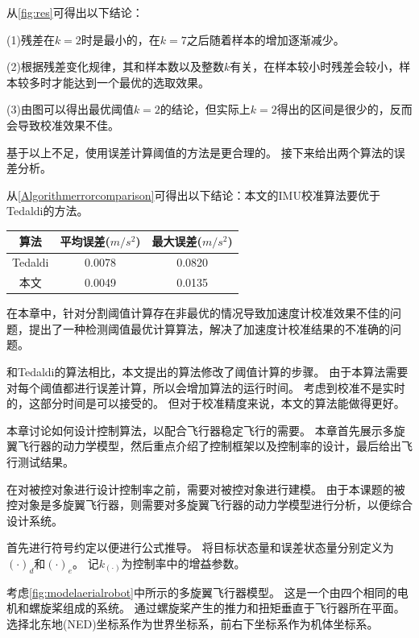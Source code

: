 \documentclass[
  type=master
]{gdutthesis}
\begin{document}
从\autoref{fig:res}可得出以下结论：

(1)残差在$k=2$时是最小的，在$k=7$之后随着样本的增加逐渐减少。

(2)根据残差变化规律，其和样本数以及整数$k$有关，在样本较小时残差会较小，样本较多时才能达到一个最优的选取效果。

(3)由图可以得出最优阈值$k=2$的结论，但实际上$k=2$得出的区间是很少的，反而会导致校准效果不佳。

基于以上不足，使用误差计算阈值的方法是更合理的。
接下来给出两个算法的误差分析。

从\autoref{Algorithmerrorcomparison}可得出以下结论：本文的IMU校准算法要优于Tedaldi的方法。
\begin{table}[h]
	\label{Algorithmerrorcomparison}
	\begin{tabular}{ccc}
		\toprule
		算法 & 平均误差($m/s^2$) & 最大误差($m/s^2$) \\
		\midrule
		Tedaldi & 0.0078 & 0.0820 \\
		本文 & 0.0049 & 0.0135 \\
		\bottomrule
	\end{tabular}
\end{table}

在本章中，针对分割阈值计算存在非最优的情况导致加速度计校准效果不佳的问题，提出了一种检测阈值最优计算算法，解决了加速度计校准结果的不准确的问题。

和Tedaldi的算法相比，本文提出的算法修改了阈值计算的步骤。
由于本算法需要对每个阈值都进行误差计算，所以会增加算法的运行时间。
考虑到校准不是实时的，这部分时间是可以接受的。
但对于校准精度来说，本文的算法能做得更好。

本章讨论如何设计控制算法，以配合飞行器稳定飞行的需要。
本章首先展示多旋翼飞行器的动力学模型，然后重点介绍了控制框架以及控制率的设计，最后给出飞行测试结果。

在对被控对象进行设计控制率之前，需要对被控对象进行建模。
由于本课题的被控对象是多旋翼飞行器，则需要对多旋翼飞行器的动力学模型进行分析，以便综合设计系统。

首先进行符号约定以便进行公式推导。
将目标状态量和误差状态量分别定义为$(\cdot)_d$和$(\cdot)_e$。
记$k_{(\cdot)}$为控制率中的增益参数。

考虑\autoref{fig:modelaerialrobot}中所示的多旋翼飞行器模型。
这是一个由四个相同的电机和螺旋桨组成的系统。
通过螺旋桨产生的推力和扭矩垂直于飞行器所在平面。
选择北东地(NED)坐标系作为世界坐标系，前右下坐标系作为机体坐标系。
\end{document}

